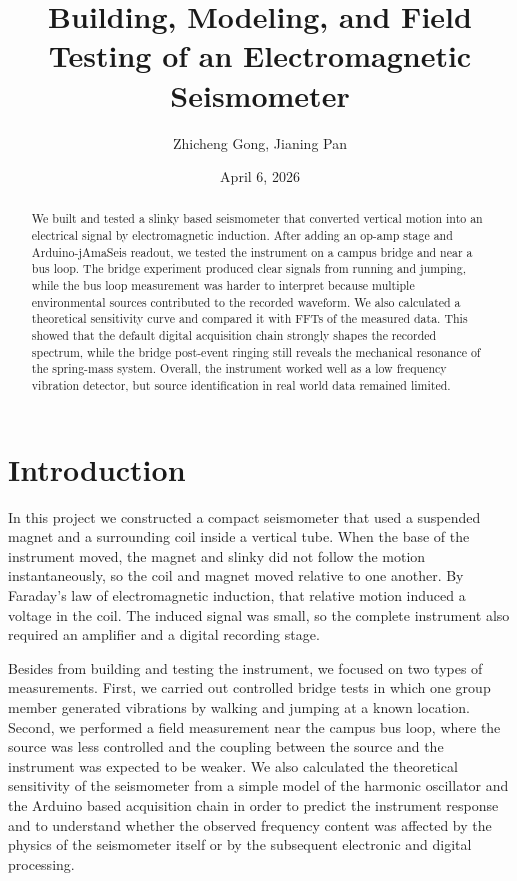 \documentclass[11pt]{article}
\title{Building, Modeling, and Field Testing of an Electromagnetic Seismometer}
\author{Zhicheng Gong, Jianing Pan}
\date{April 6, 2026}
\begin{document}
\maketitle

\begin{abstract}
We built and tested a slinky based seismometer that converted vertical motion into an electrical signal by electromagnetic induction. After adding an op-amp stage and Arduino-jAmaSeis readout, we tested the instrument on a campus bridge and near a bus loop. The bridge experiment produced clear signals from running and jumping, while the bus loop measurement was harder to interpret because multiple environmental sources contributed to the recorded waveform. We also calculated a theoretical sensitivity curve and compared it with FFTs of the measured data. This showed that the default digital acquisition chain strongly shapes the recorded spectrum, while the bridge post-event ringing still reveals the mechanical resonance of the spring-mass system. Overall, the instrument worked well as a low frequency vibration detector, but source identification in real world data remained limited.
\end{abstract}

\section{Introduction}
In this project we constructed a compact seismometer that used a suspended magnet and a surrounding coil inside a vertical tube. When the base of the instrument moved, the magnet and slinky did not follow the motion instantaneously, so the coil and magnet moved relative to one another. By Faraday's law of electromagnetic induction, that relative motion induced a voltage in the coil. The induced signal was small, so the complete instrument also required an amplifier and a digital recording stage.

Besides from building and testing the instrument, we focused on two types of measurements. First, we carried out controlled bridge tests in which one group member generated vibrations by walking and jumping at a known location. Second, we performed a field measurement near the campus bus loop, where the source was less controlled and the coupling between the source and the instrument was expected to be weaker. We also calculated the theoretical sensitivity of the seismometer from a simple model of the harmonic oscillator and the Arduino based acquisition chain in order to predict the instrument response and to understand whether the observed frequency content was affected by the physics of the seismometer itself or by the subsequent electronic and digital processing.
\end{document}
